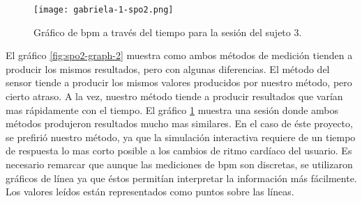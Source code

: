 \begin{figure}[H]
	\centering
    \texttt{[image: gabriela-1-spo2.png]}
    \caption{Gráfico de \acrshort{bpm} a través del tiempo para la sesión del sujeto $3$.}
	\label{fig:spo2-graph-3}
\end{figure}

El gráfico \ref{fig:spo2-graph-2} muestra como ambos métodos de medición tienden a producir los mismos resultados, pero con algunas diferencias. El método del sensor tiende a producir los mismos valores producidos por nuestro método, pero cierto atraso. A la vez, nuestro método tiende a producir resultados que varían mas rápidamente con el tiempo. El gráfico \ref{fig:spo2-graph-3} muestra una sesión donde ambos métodos produjeron resultados mucho mas similares. En el caso de éste proyecto, se prefirió nuestro método, ya que la simulación interactiva requiere de un tiempo de respuesta lo mas corto posible a los cambios de ritmo cardíaco del usuario. Es necesario remarcar que aunque las mediciones de \acrshort{bpm} son discretas, se utilizaron gráficos de línea ya que éstos permitían interpretar la información más fácilmente. Los valores leídos están representados como puntos sobre las líneas.

